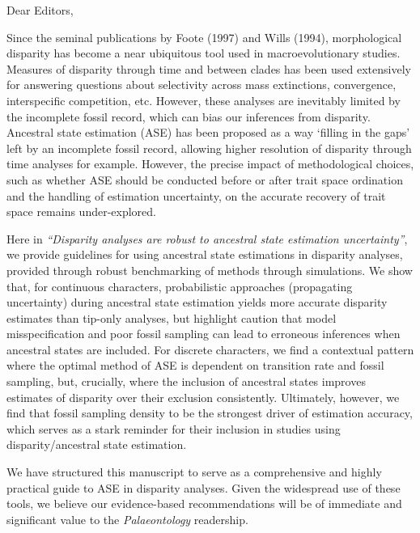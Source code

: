 \documentclass[11pt]{letter}
\begin{document}
\begin{letter}{}
\opening{Dear Editors,}

Since the seminal publications by Foote (1997) and Wills (1994), morphological disparity has become a near ubiquitous tool used in macroevolutionary studies.
Measures of disparity through time and between clades has been used extensively for answering questions about selectivity across mass extinctions, convergence, interspecific competition, etc.
However, these analyses are inevitably limited by the incomplete fossil record, which can bias our inferences from disparity.
Ancestral state estimation (ASE) has been proposed as a way `filling in the gaps' left by an incomplete fossil record, allowing higher resolution of disparity through time analyses for example.
However, the precise impact of methodological choices, such as whether ASE should be conducted before or after trait space ordination and the handling of estimation uncertainty, on the accurate recovery of trait space remains under-explored.

Here in \textit{``Disparity analyses are robust to ancestral state estimation uncertainty''}, we provide guidelines for using ancestral state estimations in disparity analyses, provided through robust benchmarking of methods through simulations.
We show that, for continuous characters, probabilistic approaches (propagating uncertainty) during ancestral state estimation yields more accurate disparity estimates than tip-only analyses, but highlight caution that model misspecification and poor fossil sampling can lead to erroneous inferences when ancestral states are included.
For discrete characters, we find a contextual pattern where the optimal method of ASE is dependent on transition rate and fossil sampling, but, crucially, where the inclusion of ancestral states improves estimates of disparity over their exclusion consistently.
Ultimately, however, we find that fossil sampling density to be the strongest driver of estimation accuracy, which serves as a stark reminder for their inclusion in studies using disparity/ancestral state estimation.

We have structured this manuscript to serve as a comprehensive and highly practical guide to ASE in disparity analyses.
Given the widespread use of these tools, we believe our evidence-based recommendations will be of immediate and significant value to the \textit{Palaeontology} readership.




\end{letter}
\end{document}
